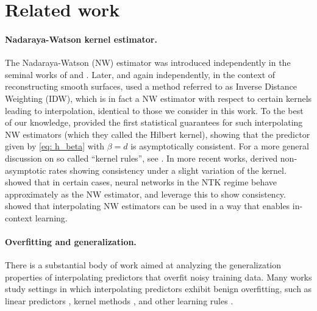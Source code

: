 \section{Related work}
\label{sec: related}
\paragraph{Nadaraya-Watson kernel estimator. } The Nadaraya-Watson (NW) estimator was introduced independently in the seminal works of \citet{nadaraya1964estimating} and \citet{watson1964smooth}. Later, and again independently, in the context of reconstructing smooth surfaces, \citet{shepard1968two} used a method referred to as Inverse Distance Weighting (IDW), which is in fact a NW estimator with respect to certain kernels leading to interpolation, identical to those we consider in this work. To the best of our knowledge, \citet{devroye1998hilbert} provided the first statistical guarantees for such interpolating NW estimators (which they called the Hilbert kernel), showing that the predictor given by \eqref{eq: h_beta} with $\beta=d$ is asymptotically consistent.
For a more general discussion on so called ``kernel rules'', see \citep[Chapter 10]{devroye2013probabilistic}.
In more recent works, \citet{belkin2019does} derived non-asymptotic rates showing consistency under a slight variation of the kernel. \citet{radhakrishnan2023wide, eilers2024generalized} showed that in certain cases, neural networks in the NTK regime behave approximately as the NW estimator, and leverage this to show consistency. \citet{abedsoltan2024context} showed that interpolating NW estimators can be used in a way that enables in-context learning. 



\paragraph{Overfitting and generalization.}

There is a substantial body of work aimed at analyzing the generalization properties of interpolating predictors that overfit noisy training data.
Many works study settings in which interpolating predictors exhibit benign overfitting,
such as linear predictors \citep{bartlett2020benign,belkin2020two,negrea2020defense,koehler2021uniform,hastie2022surprises,zhou2023optimistic,shamir2023implicit},
kernel methods \citep{yang2021exact,mei2022generalizationrandomfeat,tsigler2023benign}, and other learning rules \citep{devroye1998hilbert,belkin2018overfitting,belkin2019reconciling}.

